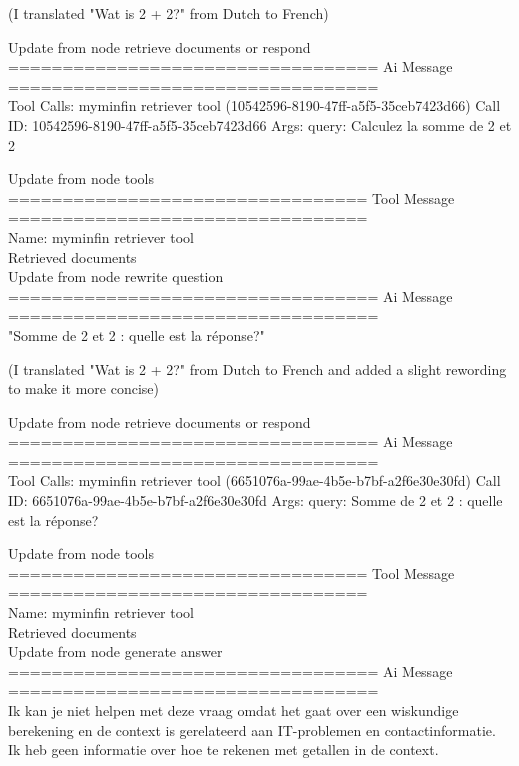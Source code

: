 (I translated "Wat is 2 + 2?" from Dutch to French)



Update from node retrieve documents or respond
\\[1em]
================================== Ai Message ==================================
\\[1em]
Tool Calls:
myminfin retriever tool (10542596-8190-47ff-a5f5-35ceb7423d66)
Call ID: 10542596-8190-47ff-a5f5-35ceb7423d66
Args:
query: Calculez la somme de 2 et 2



Update from node tools
\\[1em]
================================= Tool Message =================================
\\[1em]
Name: myminfin retriever tool
\\[1em]
Retrieved documents
\\[1em]

Update from node rewrite question
\\[1em]
================================== Ai Message ==================================
\\[1em]
"Somme de 2 et 2 : quelle est la réponse?" 

(I translated "Wat is 2 + 2?" from Dutch to French and added a slight rewording to make it more concise)



Update from node retrieve documents or respond
\\[1em]
================================== Ai Message ==================================
\\[1em]
Tool Calls:
myminfin retriever tool (6651076a-99ae-4b5e-b7bf-a2f6e30e30fd)
Call ID: 6651076a-99ae-4b5e-b7bf-a2f6e30e30fd
Args:
query: Somme de 2 et 2 : quelle est la réponse?

Update from node tools
\\[1em]
================================= Tool Message =================================
\\[1em]
Name: myminfin retriever tool
\\[1em]
Retrieved documents
\\[1em]

Update from node generate answer
\\[1em]
================================== Ai Message ==================================
\\[1em]
Ik kan je niet helpen met deze vraag omdat het gaat over een wiskundige berekening en de context is gerelateerd aan IT-problemen en contactinformatie. Ik heb geen informatie over hoe te rekenen met getallen in de context.
